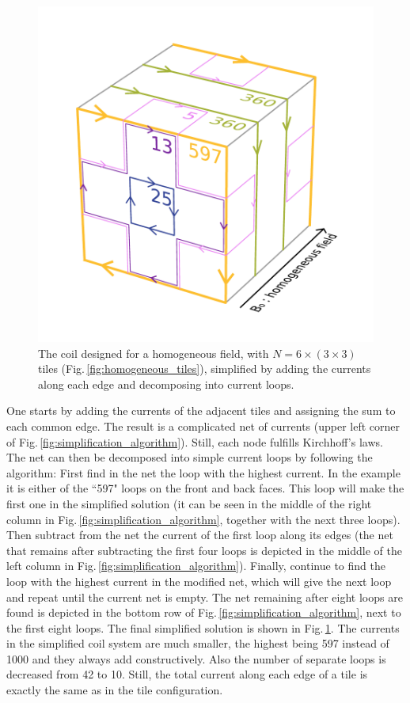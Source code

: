 \begin{figure}
  \centering
  \includegraphics[width=0.6\linewidth]{gfx/coils/algorithm_simplified_5.pdf}
  \caption{The coil designed for a homogeneous field, with $N = 6 \times (3 \times 3)$ tiles (Fig.\,\ref{fig:homogeneous_tiles}), simplified by adding the currents along each edge and decomposing into current loops.}
  \label{fig:homogeneous_coils}
\end{figure}

One starts by adding the currents of the adjacent tiles and assigning the sum to each common edge. The result is a complicated net of currents (upper left corner of Fig.\,\ref{fig:simplification_algorithm}). Still, each node fulfills Kirchhoff's laws. The net can then be decomposed into simple current loops by following the algorithm: First find in the net the loop with the highest current. In the example it is either of the ``597" loops on the front and back faces. This loop will make the first one in the simplified solution (it can be seen in the middle of the right column in Fig.\,\ref{fig:simplification_algorithm}, together with the next three loops). Then subtract from the net the current of the first loop along its edges (the net that remains after subtracting the first four loops is depicted in the middle of the left column in Fig.\,\ref{fig:simplification_algorithm}). Finally, continue to find the loop with the highest current in the modified net, which will give the next loop and repeat until the current net is empty. The net remaining after eight loops are found is depicted in the bottom row of Fig.\,\ref{fig:simplification_algorithm}, next to the first eight loops. The final simplified solution is shown in Fig.\,\ref{fig:homogeneous_coils}. The currents in the simplified coil system are much smaller, the highest being 597 instead of 1000 and they always add constructively. Also the number of separate loops is decreased from 42 to 10. Still, the total current along each edge of a tile is exactly the same as in the tile configuration.

